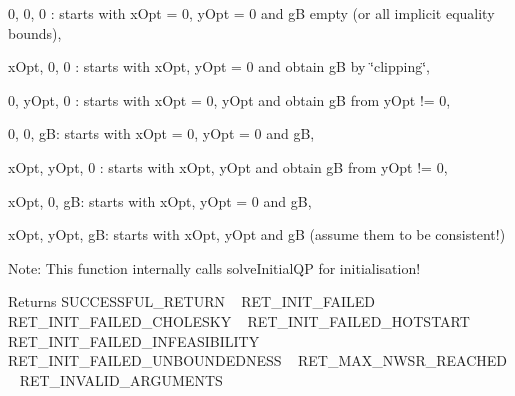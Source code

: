 \begin{DoxyEnumerate}
\item 0, 0, 0 \+: starts with x\+Opt = 0, y\+Opt = 0 and gB empty (or all implicit equality bounds), ~\newline

\item x\+Opt, 0, 0 \+: starts with x\+Opt, y\+Opt = 0 and obtain gB by \char`\"{}clipping\char`\"{}, ~\newline

\item 0, y\+Opt, 0 \+: starts with x\+Opt = 0, y\+Opt and obtain gB from y\+Opt != 0, ~\newline

\item 0, 0, gB\+: starts with x\+Opt = 0, y\+Opt = 0 and gB, ~\newline

\item x\+Opt, y\+Opt, 0 \+: starts with x\+Opt, y\+Opt and obtain gB from y\+Opt != 0, ~\newline

\item x\+Opt, 0, gB\+: starts with x\+Opt, y\+Opt = 0 and gB, ~\newline

\item x\+Opt, y\+Opt, gB\+: starts with x\+Opt, y\+Opt and gB (assume them to be consistent!)
\end{DoxyEnumerate}

Note\+: This function internally calls solve\+Initial\+QP for initialisation!

\begin{DoxyReturn}{Returns}
S\+U\+C\+C\+E\+S\+S\+F\+U\+L\+\_\+\+R\+E\+T\+U\+RN ~\newline
 R\+E\+T\+\_\+\+I\+N\+I\+T\+\_\+\+F\+A\+I\+L\+ED ~\newline
 R\+E\+T\+\_\+\+I\+N\+I\+T\+\_\+\+F\+A\+I\+L\+E\+D\+\_\+\+C\+H\+O\+L\+E\+S\+KY ~\newline
 R\+E\+T\+\_\+\+I\+N\+I\+T\+\_\+\+F\+A\+I\+L\+E\+D\+\_\+\+H\+O\+T\+S\+T\+A\+RT ~\newline
 R\+E\+T\+\_\+\+I\+N\+I\+T\+\_\+\+F\+A\+I\+L\+E\+D\+\_\+\+I\+N\+F\+E\+A\+S\+I\+B\+I\+L\+I\+TY ~\newline
 R\+E\+T\+\_\+\+I\+N\+I\+T\+\_\+\+F\+A\+I\+L\+E\+D\+\_\+\+U\+N\+B\+O\+U\+N\+D\+E\+D\+N\+E\+SS ~\newline
 R\+E\+T\+\_\+\+M\+A\+X\+\_\+\+N\+W\+S\+R\+\_\+\+R\+E\+A\+C\+H\+ED ~\newline
 R\+E\+T\+\_\+\+I\+N\+V\+A\+L\+I\+D\+\_\+\+A\+R\+G\+U\+M\+E\+N\+TS 
\end{DoxyReturn}

